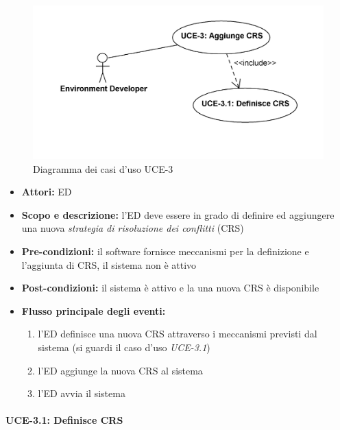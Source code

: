 
\begin{figure}
\centering
\includegraphics[width=1.1\textwidth]{Immagini/Capitolo2/UseCases/UCE-3.png}
\caption{Diagramma dei casi d'uso UCE-3}\label{fig:uc-uce-3}
\end{figure}


\begin{itemize}
	\item \textbf{Attori:} ED
	\item \textbf{Scopo e descrizione:} l'ED deve essere in grado di definire ed aggiungere una nuova \emph{strategia di risoluzione dei conflitti} (CRS)
	\item \textbf{Pre-condizioni:} il software fornisce meccanismi per la definizione e l'aggiunta di CRS, il sistema non è attivo
	\item \textbf{Post-condizioni:} il sistema è attivo e la una nuova CRS è disponibile
	\item \textbf{Flusso principale degli eventi:}
		\begin{enumerate}
			\item l'ED definisce una nuova CRS attraverso i meccanismi previsti dal sistema (si guardi il caso d'uso \emph{UCE-3.1})
			\item l'ED aggiunge la nuova CRS al sistema
			\item l'ED avvia il sistema
		\end{enumerate}
\end{itemize}


\paragraph{UCE-3.1: Definisce CRS}

